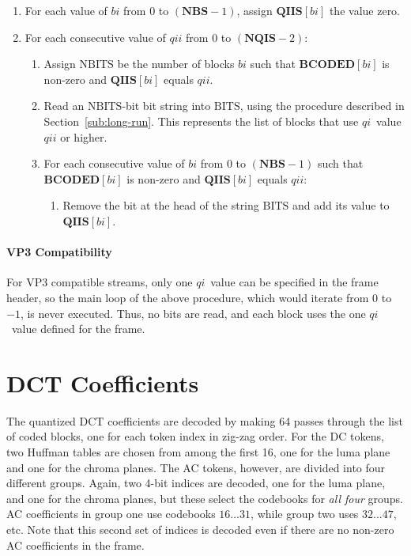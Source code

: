 \documentclass[9pt,letterpaper]{book}
\newcommand{\idx}[1]{{\ensuremath{\mathit{#1}}}}
\newcommand{\qi}{\idx{qi}}
\newcommand{\bi}{\idx{bi}}
\newcommand{\qii}{\idx{qii}}
\newcommand{\bitvar}[1]{\ensuremath{\mathbf{\bm{#1}}}}
\newcommand{\locvar}[1]{\ensuremath{\mathrm{#1}}}
\numberwithin{equation}{chapter}
\numberwithin{figure}{chapter}
\numberwithin{table}{chapter}
\begin{document}
\begin{enumerate}
\item
For each value of \locvar{\bi} from 0 to $(\bitvar{NBS}-1)$, assign
 $\bitvar{QIIS}[\locvar{\bi}]$ the value zero.
\item
For each consecutive value of \locvar{\qii} from 0 to $(\bitvar{NQIS}-2)$:
\begin{enumerate}
\item
Assign \locvar{NBITS} be the number of blocks \locvar{\bi} such that
 $\bitvar{BCODED}[\locvar{\bi}]$ is non-zero and $\bitvar{QIIS}[\locvar{\bi}]$
 equals $\locvar{\qii}$.
\item
Read an \locvar{NBITS}-bit bit string into \locvar{BITS}, using the procedure
 described in Section~\ref{sub:long-run}.
This represents the list of blocks that use \qi\ value \locvar{\qii} or higher.
\item
For each consecutive value of \locvar{\bi} from 0 to $(\bitvar{NBS}-1)$ such
 that $\bitvar{BCODED}[\locvar{\bi}]$ is non-zero and
 $\bitvar{QIIS}[\locvar{\bi}]$ equals $\locvar{\qii}$:
\begin{enumerate}
\item
Remove the bit at the head of the string \locvar{BITS} and add its value to
 $\bitvar{QIIS}[\locvar{\bi}]$.
\end{enumerate}
\end{enumerate}
\end{enumerate}

\paragraph{VP3 Compatibility}

For VP3 compatible streams, only one \qi\ value can be specified in the frame
 header, so the main loop of the above procedure, which would iterate from $0$
 to $-1$, is never executed.
Thus, no bits are read, and each block uses the one \qi\ value defined for the
 frame.

\cleardoublepage

\section{DCT Coefficients}
\label{sec:dct-decode}

The quantized DCT coefficients are decoded by making 64 passes through the list
 of coded blocks, one for each token index in zig-zag order.
For the DC tokens, two Huffman tables are chosen from among the first 16, one
 for the luma plane and one for the chroma planes.
The AC tokens, however, are divided into four different groups.
Again, two 4-bit indices are decoded, one for the luma plane, and one for the
 chroma planes, but these select the codebooks for {\em all four} groups.
AC coefficients in group one use codebooks $16\ldots 31$, while group two uses
 $32\ldots 47$, etc.
Note that this second set of indices is decoded even if there are no non-zero
 AC coefficients in the frame.
\end{document}
